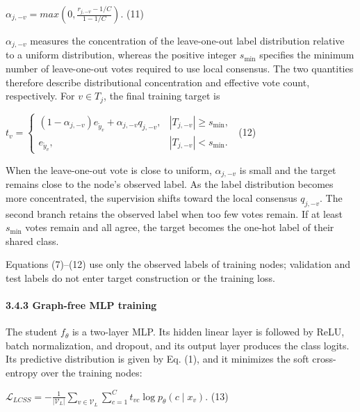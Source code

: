 \(\alpha_{j, - v} = max\left( 0,\frac{r_{j, - v} - 1/C}{1 - 1/C} \right).\) (11)

\(\alpha_{j, - v}\) measures the concentration of the leave-one-out label distribution relative to a uniform distribution, whereas the positive integer \(s_{\min}\) specifies the minimum number of leave-one-out votes required to use local consensus. The two quantities therefore describe distributional concentration and effective vote count, respectively. For \(v \in T_{j}\), the final training target is

\(t_{v} = \left\{ \begin{matrix}
(1 - \alpha_{j, - v})e_{{\widetilde{y}}_{v}} + \alpha_{j, - v}q_{j, - v}, & |T_{j, - v}| \geq s_{\min}, \\
e_{{\widetilde{y}}_{v}}, & |T_{j, - v}| < s_{\min}.
\end{matrix} \right.\ \) (12)

When the leave-one-out vote is close to uniform, \(\alpha_{j, - v}\) is small and the target remains close to the node's observed label. As the label distribution becomes more concentrated, the supervision shifts toward the local consensus \(q_{j, - v}\). The second branch retains the observed label when too few votes remain. If at least \(s_{\min}\) votes remain and all agree, the target becomes the one-hot label of their shared class.

Equations (7)--(12) use only the observed labels of training nodes; validation and test labels do not enter target construction or the training loss.

\paragraph{}\label{section}

\paragraph{3.4.3 Graph-free MLP training}\label{graph-free-mlp-training}

The student \(f_{\theta}\) is a two-layer MLP. Its hidden linear layer is followed by ReLU, batch normalization, and dropout, and its output layer produces the class logits. Its predictive distribution is given by Eq. (1), and it minimizes the soft cross-entropy over the training nodes:

\(\mathcal{L}_{LCSS} = - \frac{1}{|\mathcal{V}_{L}|}\sum_{v \in \mathcal{V}_{L}}^{}{\sum_{c = 1}^{C}t_{vc}}\log p_{\theta}(c \mid x_{v}).\) (13)

